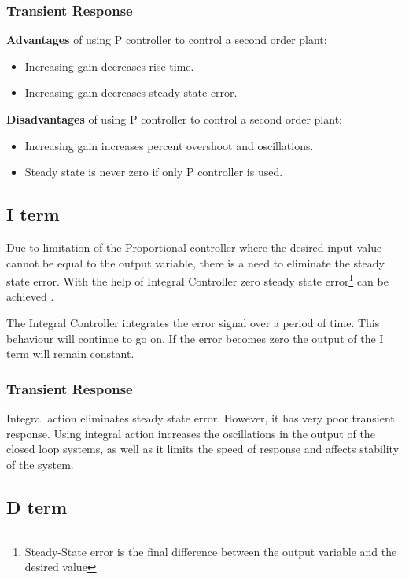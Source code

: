 \subsubsection*{Transient Response}

 \textbf{Advantages} of using P controller to control a second order plant:

\begin{itemize}
\item Increasing gain decreases rise time.
\item Increasing gain decreases steady state error.
\end{itemize}
\textbf{Disadvantages} of using P controller to control a second order plant:

\begin{itemize}
\item Increasing gain increases percent overshoot and oscillations.
\item Steady state is never zero if only P controller is used.
\end{itemize}

\subsection{I term}

Due to limitation of the Proportional controller where the desired input value cannot be equal to the output variable, there is a need to eliminate the steady state error. With the help of Integral Controller zero steady state error\footnote{Steady-State error is the final difference between the output variable and the desired value} can be achieved \cite{pid}.

The Integral Controller integrates the error signal over a period of time. This behaviour will continue to go on. If the error becomes zero the output of the I term will remain constant.

\subsubsection*{Transient Response}

Integral action eliminates steady state error. However, it has very poor transient response. Using integral action increases the oscillations in the output of the closed loop systems, as well as it limits the speed of response and affects stability of the system.

\subsection{D term}


